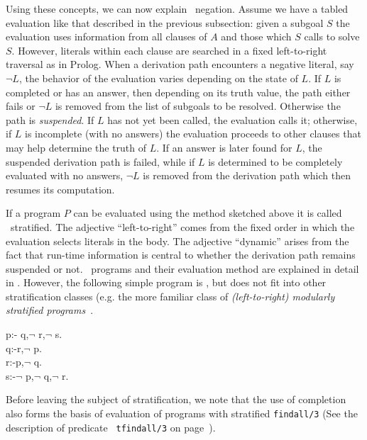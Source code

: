 Using these concepts, we can now explain \LRD\ negation.  Assume we
have a tabled evaluation like that described in the previous
subsection: given a subgoal $S$ the evaluation uses information from
all clauses of $A$ and those which $S$ calls to solve $S$.  However,
literals within each clause are searched in a fixed left-to-right
traversal as in Prolog.  When a derivation path encounters a negative
literal, say $\neg L$, the behavior of the evaluation varies depending
on the state of $L$.  If $L$ is completed or has an answer, then
depending on its truth value, the path either fails or $\neg L$ is
removed from the list of subgoals to be resolved.  Otherwise the path
is {\em suspended}.  If $L$ has not yet been called, the evaluation
calls it; otherwise, if $L$ is incomplete (with no answers) the
evaluation proceeds to other clauses that may help determine the truth
of $L$.  If an answer is later found for $L$, the suspended derivation
path is failed, while if $L$ is determined to be completely evaluated
with no answers, $\neg L$ is removed from the derivation path which
then resumes its computation.

If a program $P$ can be evaluated using the method sketched above it
is called \LRD\ stratified.  The adjective ``left-to-right'' comes
from the fixed order in which the evaluation selects literals in the
body.  The adjective ``dynamic'' arises from the fact that run-time
information is central to whether the derivation path remains
suspended or not.  \LRD\ programs and their evaluation method are
explained in detail in \cite{SaSW95a,Przy89d}.  However, the following
simple program is \LRD, but does not fit into other stratification
classes (e.g. the more familiar class of {\em (left-to-right)
modularly stratified programs}~\cite{Ross91}.
\begin{center}
\begin{Prog}
p:- q,$\neg$ r,$\neg$ s.\\
q:-r,$\neg$ p. \\ 
r:-p,$\neg$ q. \\
s:-$\neg$ p,$\neg$ q,$\neg$ r. \\
\end{Prog} 
\end{center}

Before leaving the subject of stratification, we note that the use of
completion also forms the basis of evaluation of programs with
stratified {\tt findall/3} (See the description of predicate {\tt
tfindall/3} on page~\pageref{tfindall/3}).

